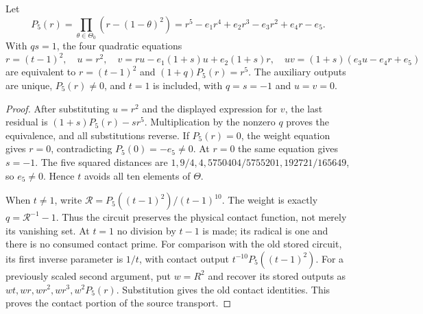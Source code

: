 \begin{lemma}\label{q198:contact-circuit}
Let
\[
 P_5(r)=\prod_{\theta\in\Theta_0}(r-(1-\theta)^2)
 =r^5-e_1r^4+e_2r^3-e_3r^2+e_4r-e_5.
\]
With $qs=1$, the four quadratic equations
\[
 r=(t-1)^2,\quad u=r^2,\quad
 v=ru-e_1(1+s)u+e_2(1+s)r,\quad
 uv=(1+s)(e_3u-e_4r+e_5)
\]
are equivalent to $r=(t-1)^2$ and $(1+q)P_5(r)=r^5$.
The auxiliary outputs are unique, $P_5(r)\ne0$, and $t=1$ is
included, with $q=s=-1$ and $u=v=0$.
\end{lemma}
\begin{proof}
After substituting $u=r^2$ and the displayed expression for $v$,
the last residual is $(1+s)P_5(r)-sr^5$. Multiplication by the
nonzero $q$ proves the equivalence, and all substitutions reverse.
If $P_5(r)=0$, the weight equation gives $r=0$, contradicting
$P_5(0)=-e_5\ne0$. At $r=0$ the same equation gives $s=-1$.
The five squared distances are
$1,9/4,4,5750404/5755201,192721/165649$, so $e_5\ne0$.
Hence $t$ avoids all ten elements of $\Theta$.

When $t\ne1$, write
$\mathcal R=P_5((t-1)^2)/(t-1)^{10}$. The weight is exactly
$q=\mathcal R^{-1}-1$. Thus the circuit preserves the physical
contact function, not merely its vanishing set. At $t=1$ no division
by $t-1$ is made; its radical is one and there is no consumed
contact prime. For comparison with the old stored circuit, its first
inverse parameter is $1/t$, with contact output
$t^{-10}P_5((t-1)^2)$. For a previously scaled second argument,
put $w=R^2$ and recover its stored outputs as
$wt,wr,wr^2,wr^3,w^2P_5(r)$. Substitution gives the old contact
identities. This proves the contact portion of the source transport.
\end{proof}


